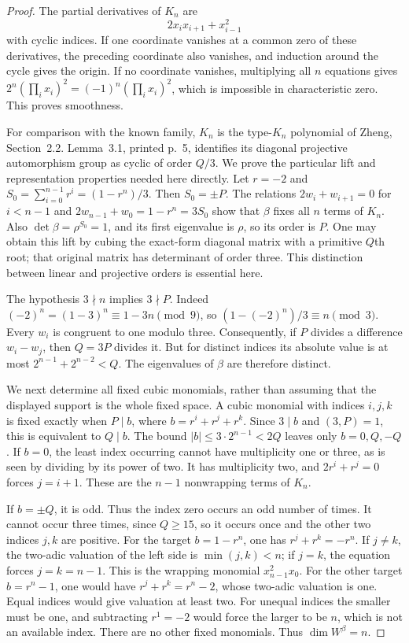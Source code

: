 \documentclass[11pt,a4paper]{article}
\begin{document}
\begin{proof}
The partial derivatives of $K_n$ are
\[
                 2x_i x_{i+1}+x_{i-1}^2
\]
with cyclic indices. If one coordinate vanishes at a common
zero of these derivatives, the preceding coordinate also
vanishes, and induction around the cycle gives the origin.
If no coordinate vanishes, multiplying all $n$ equations gives
$2^n(\prod_i x_i)^2=(-1)^n(\prod_i x_i)^2$, which is impossible
in characteristic zero. This proves smoothness.

For comparison with the known family, $K_n$ is the type-$K_n$
polynomial of Zheng, Section~2.2. Lemma~3.1, printed p.~5,
identifies its diagonal projective automorphism group as
cyclic of order $Q/3$. We prove the particular lift and
representation properties needed here directly.
Let $r=-2$ and $S_0=\sum_{i=0}^{n-1}r^i=(1-r^n)/3$.
Then $S_0=\pm P$. The relations
$2w_i+w_{i+1}=0$ for $i<n-1$ and
$2w_{n-1}+w_0=1-r^n=3S_0$ show that $\beta$ fixes
all $n$ terms of $K_n$. Also
$\det\beta=\rho^{S_0}=1$, and its first eigenvalue is $\rho$,
so its order is $P$.
One may obtain this lift by cubing the exact-form diagonal
matrix with a primitive $Q$th root; that original matrix has
determinant of order three. This distinction between linear
and projective orders is essential here.

The hypothesis $3\nmid n$ implies $3\nmid P$. Indeed
$(-2)^n=(1-3)^n\equiv1-3n\pmod9$, so
$(1-(-2)^n)/3\equiv n\pmod3$.
Every $w_i$ is congruent to one modulo three.
Consequently, if $P$ divides a difference $w_i-w_j$, then
$Q=3P$ divides it. But for distinct indices its absolute
value is at most $2^{n-1}+2^{n-2}<Q$.
The eigenvalues of $\beta$ are therefore distinct.

We next determine all fixed cubic monomials, rather than
assuming that the displayed support is the whole fixed space.
A cubic monomial with indices $i,j,k$ is fixed exactly when
$P\mid b$, where $b=r^i+r^j+r^k$. Since $3\mid b$ and
$(3,P)=1$, this is equivalent to $Q\mid b$.
The bound $|b|\le3\cdot2^{n-1}<2Q$ leaves only
$b=0,Q,-Q$.
If $b=0$, the least index occurring cannot have multiplicity
one or three, as is seen by dividing by its power of two.
It has multiplicity two, and
$2r^i+r^j=0$ forces $j=i+1$.
These are the $n-1$ nonwrapping terms of $K_n$.

If $b=\pm Q$, it is odd. Thus the index zero occurs an odd
number of times. It cannot occur three times, since
$Q\ge15$, so it occurs once and the other two indices
$j,k$ are positive. For the target $b=1-r^n$, one has
$r^j+r^k=-r^n$. If $j\ne k$, the two-adic valuation of
the left side is $\min(j,k)<n$; if $j=k$, the equation
forces $j=k=n-1$. This is the wrapping monomial
$x_{n-1}^2x_0$. For the other target $b=r^n-1$,
one would have $r^j+r^k=r^n-2$, whose two-adic valuation
is one. Equal indices would give valuation at least two.
For unequal indices the smaller must be one, and subtracting
$r^1=-2$ would force the larger to be $n$, which is not
an available index. There are no other fixed monomials.
Thus $\dim W^\beta=n$.


\end{proof}
\end{document}
